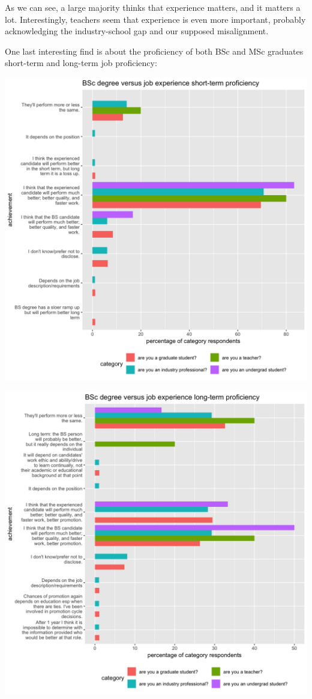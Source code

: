 \documentclass{sigchi}
\begin{document}
As we can see, a large majority thinks that experience matters, and it matters a lot. Interestingly, teachers seem that experience is even more important, probably acknowledging the industry-school gap and our supposed misalignment.

One last interesting find is about the proficiency of both BSc and MSc graduates short-term and long-term job proficiency:

\includegraphics[scale=0.2]{../data-analysis/plots_output/BSc_degree_versus_job_experience_short-term_proficiency.png}

\includegraphics[scale=0.2]{../data-analysis/plots_output/BSc_degree_versus_job_experience_long-term_proficiency.png}
\end{document}
